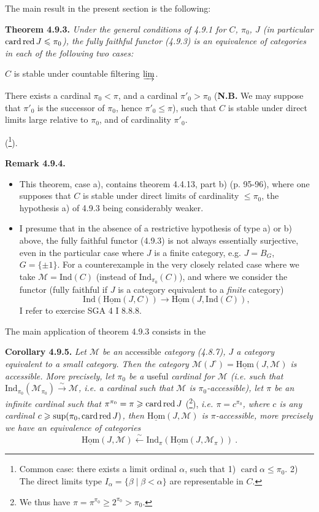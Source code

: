 \documentclass[11pt]{article}
\newcommand{\printedpage}[1]{\marginpar{\footnotesize p.~#1}}
\newcommand{\msp}[1]{\marginpar{\footnotesize [#1]}}
\newcommand{\uHom}{\underline{\mathrm{Hom}}}
\newcommand{\Ind}{\mathrm{Ind}}
\newcommand{\card}{\operatorname{card}}
\newcommand{\cardred}{\mathop{\textup{card\,red}}\nolimits}
\newcommand{\cM}{\mathcal{M}}
\begin{document}
\printedpage{79}

The main result in the present section is the following:

\textbf{Theorem 4.9.3.} \textit{Under the general conditions of 4.9.1 for $C$, $\pi_0$, $J$ (in particular} $\cardred J \leqslant \pi_0$\textit{), the fully faithful functor (4.9.3) is an equivalence of categories in each of the following two cases:}
\begin{itemize}[label={}]
{\itshape
\item[a)] $C$ is stable under countable filtering $\varinjlim$.
\item[b)] There exists a cardinal $\pi_0 < \pi$, and a cardinal $\pi'_0 > \pi_0$ \textup{(}\textbf{\upshape N.B.} We may suppose that $\pi'_0$ is the successor of $\pi_0$, hence $\pi'_0 \leqslant \pi$), such that $C$ is stable under direct limits large relative to $\pi_0$, and of cardinality $\pi'_0$.
}
\end{itemize}
(\footnote[94]{Common case: there exists a limit ordinal $\alpha$, such that 1) $\card \alpha \leqslant \pi_0$. 2) The direct limits type $I_\alpha = \{\beta \mid \beta < \alpha\}$ are representable in $C$.}).

\textbf{Remark 4.9.4.}
\begin{itemize}[label={}]
\item[a)] This theorem, case a), contains theorem 4.4.13, part b) (p. 95-96), where one supposes that $C$ is stable under direct limits of cardinality $\leqslant \pi_0$, the hypothesis a) of 4.9.3 being considerably weaker.
\item[b)] \msp{page 220}I presume that in the absence of a restrictive hypothesis of type a) or b) above, the fully faithful functor (4.9.3) is not always essentially surjective, even in the particular case where $J$ is a finite category, e.g. $J = B_G$, $G = \{\pm 1\}$. For a counterexample in the very closely related case where we take $\cM = \Ind(C)$ (instead of $\Ind_{\pi_0}(C)$), and where we consider the functor (fully faithful if $J$ is a category equivalent to a \textit{finite} category) %
\[
\Ind(\uHom(J,C)) \longrightarrow \uHom(J,\Ind(C)),
\]
I refer to exercise SGA 4 I 8.8.8.
\end{itemize}
The main application of theorem 4.9.3 consists in the

\textbf{Corollary 4.9.5.} \textit{Let $\cM$ be an} accessible \textit{category (4.8.7), $J$ a category equivalent to a small category. Then the category $\cM(J^\circ) = \uHom(J,\cM)$ is accessible. More precisely, let $\pi_0$ be a} useful \textit{cardinal for $\cM$ (i.e. such that $\Ind_{\pi_0}(\cM_{\pi_0}) \xrightarrow{\sim} \cM$, i.e. a cardinal such that $\cM$ is $\pi_0$-accessible), let $\pi$ be an infinite cardinal such that $\pi^{\pi_0} = \pi \geqslant \cardred J$} (\footnote[95]{We thus have $\pi = \pi^{\pi_0} \geqslant 2^{\pi_0} > \pi_0$.}), \textit{i.e. $\pi = c^{\pi_0}$, where $c$ is any cardinal $c \geqslant \sup(\pi_0, \cardred J)$, then $\uHom(J,\cM)$ is $\pi$-accessible, more precisely we have an equivalence of categories} %
\[
\uHom(J,\cM) \xleftarrow{\ \sim\ } \Ind_\pi(\uHom(J,\cM_\pi)) \ . \tag*{(4.9.5.1)}
\]
\end{document}
